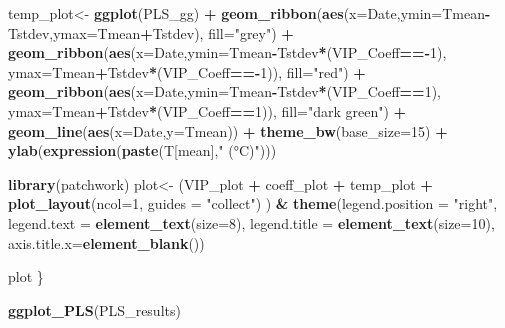 \documentclass[
]{book}
\newenvironment{Shaded}{\begin{snugshade}}{\end{snugshade}}
\newcommand{\DataTypeTok}[1]{\textcolor[rgb]{0.13,0.29,0.53}{#1}}
\newcommand{\DecValTok}[1]{\textcolor[rgb]{0.00,0.00,0.81}{#1}}
\newcommand{\KeywordTok}[1]{\textcolor[rgb]{0.13,0.29,0.53}{\textbf{#1}}}
\newcommand{\NormalTok}[1]{#1}
\newcommand{\OperatorTok}[1]{\textcolor[rgb]{0.81,0.36,0.00}{\textbf{#1}}}
\newcommand{\StringTok}[1]{\textcolor[rgb]{0.31,0.60,0.02}{#1}}
\begin{document}
\begin{Shaded}
\begin{Highlighting}[]
\NormalTok{  temp_plot<-}\StringTok{ }\KeywordTok{ggplot}\NormalTok{(PLS_gg) }\OperatorTok{+}
\StringTok{    }\KeywordTok{geom_ribbon}\NormalTok{(}\KeywordTok{aes}\NormalTok{(}\DataTypeTok{x=}\NormalTok{Date,}\DataTypeTok{ymin=}\NormalTok{Tmean}\OperatorTok{-}\NormalTok{Tstdev,}\DataTypeTok{ymax=}\NormalTok{Tmean}\OperatorTok{+}\NormalTok{Tstdev),}
                \DataTypeTok{fill=}\StringTok{"grey"}\NormalTok{) }\OperatorTok{+}
\StringTok{    }\KeywordTok{geom_ribbon}\NormalTok{(}\KeywordTok{aes}\NormalTok{(}\DataTypeTok{x=}\NormalTok{Date,}\DataTypeTok{ymin=}\NormalTok{Tmean}\OperatorTok{-}\NormalTok{Tstdev}\OperatorTok{*}\NormalTok{(VIP_Coeff}\OperatorTok{==-}\DecValTok{1}\NormalTok{),}
                    \DataTypeTok{ymax=}\NormalTok{Tmean}\OperatorTok{+}\NormalTok{Tstdev}\OperatorTok{*}\NormalTok{(VIP_Coeff}\OperatorTok{==-}\DecValTok{1}\NormalTok{)),}
                \DataTypeTok{fill=}\StringTok{"red"}\NormalTok{) }\OperatorTok{+}
\StringTok{    }\KeywordTok{geom_ribbon}\NormalTok{(}\KeywordTok{aes}\NormalTok{(}\DataTypeTok{x=}\NormalTok{Date,}\DataTypeTok{ymin=}\NormalTok{Tmean}\OperatorTok{-}\NormalTok{Tstdev}\OperatorTok{*}\NormalTok{(VIP_Coeff}\OperatorTok{==}\DecValTok{1}\NormalTok{),}
                    \DataTypeTok{ymax=}\NormalTok{Tmean}\OperatorTok{+}\NormalTok{Tstdev}\OperatorTok{*}\NormalTok{(VIP_Coeff}\OperatorTok{==}\DecValTok{1}\NormalTok{)),}
                \DataTypeTok{fill=}\StringTok{"dark green"}\NormalTok{) }\OperatorTok{+}
\StringTok{    }\KeywordTok{geom_line}\NormalTok{(}\KeywordTok{aes}\NormalTok{(}\DataTypeTok{x=}\NormalTok{Date,}\DataTypeTok{y=}\NormalTok{Tmean)) }\OperatorTok{+}
\StringTok{    }\KeywordTok{theme_bw}\NormalTok{(}\DataTypeTok{base_size=}\DecValTok{15}\NormalTok{) }\OperatorTok{+}
\StringTok{    }\KeywordTok{ylab}\NormalTok{(}\KeywordTok{expression}\NormalTok{(}\KeywordTok{paste}\NormalTok{(T[mean],}\StringTok{" (°C)"}\NormalTok{)))}

  \KeywordTok{library}\NormalTok{(patchwork)}
\NormalTok{  plot<-}\StringTok{ }\NormalTok{(VIP_plot }\OperatorTok{+}
\StringTok{            }\NormalTok{coeff_plot }\OperatorTok{+}
\StringTok{            }\NormalTok{temp_plot }\OperatorTok{+}
\StringTok{            }\KeywordTok{plot_layout}\NormalTok{(}\DataTypeTok{ncol=}\DecValTok{1}\NormalTok{,}
                        \DataTypeTok{guides =} \StringTok{"collect"}\NormalTok{)}
\NormalTok{          ) }\OperatorTok{&}\StringTok{ }\KeywordTok{theme}\NormalTok{(}\DataTypeTok{legend.position =} \StringTok{"right"}\NormalTok{,}
                    \DataTypeTok{legend.text =} \KeywordTok{element_text}\NormalTok{(}\DataTypeTok{size=}\DecValTok{8}\NormalTok{),}
                    \DataTypeTok{legend.title =} \KeywordTok{element_text}\NormalTok{(}\DataTypeTok{size=}\DecValTok{10}\NormalTok{),}
                    \DataTypeTok{axis.title.x=}\KeywordTok{element_blank}\NormalTok{())}

\NormalTok{plot}
\NormalTok{\}}

\KeywordTok{ggplot_PLS}\NormalTok{(PLS_results)}
\end{Highlighting}
\end{Shaded}
\end{document}
